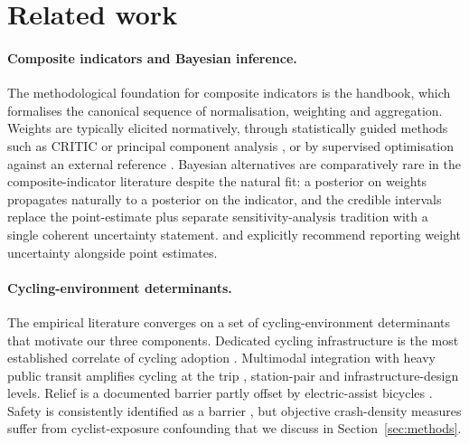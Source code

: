 \documentclass[11pt,a4paper]{article}
\begin{document}
\section{Related work}
\label{sec:related}

\paragraph{Composite indicators and Bayesian inference.}
The methodological foundation for composite indicators is the
\citet{OECD2008} handbook, which formalises the canonical
sequence of normalisation, weighting and aggregation. Weights
are typically elicited normatively, through statistically guided
methods such as CRITIC \citep{Diakoulaki1995} or principal
component analysis \citep{Nardo2005}, or by supervised
optimisation against an external reference
\citep{Saisana2005, OECD2008}. Bayesian alternatives are
comparatively rare in the composite-indicator literature
despite the natural fit: a posterior on weights propagates
naturally to a posterior on the indicator, and the credible
intervals replace the point-estimate plus separate
sensitivity-analysis tradition with a single coherent
uncertainty statement. \citet{Saltelli2008} and
\citet{Saisana2005} explicitly recommend reporting weight
uncertainty alongside point estimates.

\paragraph{Cycling-environment determinants.}
The empirical literature converges on a set of cycling-environment
determinants that motivate our three components. Dedicated
cycling infrastructure is the most established correlate of
cycling adoption \citep{Pucher2010, Heinen2010, Buehler2012,
Garrard2008, Schoner2014}. Multimodal integration with heavy
public transit amplifies cycling at the trip
\citep{Saberi2018}, station-pair \citep{FaghihImani2014} and
infrastructure-design \citep{Martens2007, ElGeneidy2016} levels.
Relief is a documented barrier \citep{Parkin2008, Rietveld2004,
Heinen2010} partly offset by electric-assist bicycles
\citep{Fishman2016, Eren2020}. Safety is consistently identified
as a barrier \citep{Garrard2012, Reynolds2009, Pucher2010,
Aldred2016}, but objective crash-density measures suffer from
cyclist-exposure confounding \citep{Reynolds2009, Schepers2014}
that we discuss in Section~\ref{sec:methods}.
\end{document}

